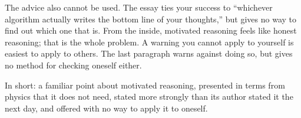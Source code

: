 \begin{afterword}
The advice also cannot be used. The essay ties your success to ``whichever algorithm actually writes the bottom line of your thoughts,'' but gives no way to find out which one that is. From the inside, motivated reasoning feels like honest reasoning; that is the whole problem. A warning you cannot apply to yourself is easiest to apply to others. The last paragraph warns against doing so, but gives no method for checking oneself either.

In short: a familiar point about motivated reasoning, presented in terms from physics that it does not need, stated more strongly than its author stated it the next day, and offered with no way to apply it to oneself.
\end{afterword}
